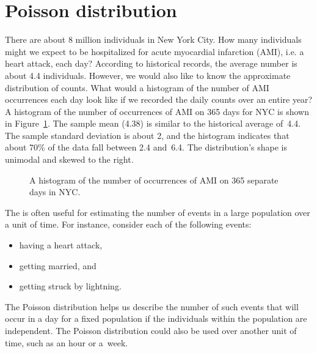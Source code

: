 



\section{Poisson distribution}
\label{poisson}


\begin{examplewrap}
\begin{nexample}{There are about 8 million individuals
    in New York City.
    How many individuals might we expect to be hospitalized
    for acute myocardial infarction (AMI), i.e. a heart attack,
    each day?
    According to historical records, the average number is
    about 4.4 individuals.
    However, we would also like to know the approximate
    distribution of counts.
    What would a histogram of the number of AMI occurrences
    each day look like if we recorded the daily counts over
    an entire year?}
  \label{amiIncidencesEachDayOver1YearInNYCExample}%
  A histogram of the number of occurrences of AMI on 365 days
  for NYC is shown in
  Figure~\ref{amiIncidencesOver100Days}.\footnotemark{}
  The sample mean (4.38) is similar to the historical average
  of~4.4.
  The sample standard deviation is about 2, and the histogram
  indicates that about 70\% of the data fall between 2.4 and~6.4.
  The distribution's shape is unimodal and skewed to the right.
\end{nexample}
\end{examplewrap}

\begin{figure}[h]
  \centering
  \caption{A histogram of the number of occurrences
      of AMI on 365 separate days in NYC.}
  \label{amiIncidencesOver100Days}
\end{figure}

The  is often useful for estimating the number of events in a large population over a unit of time. For instance, consider each of the following events:
\begin{itemize}
\setlength{\itemsep}{0mm}
\item having a heart attack,
\item getting married, and
\item getting struck by lightning.
\end{itemize}
The Poisson distribution helps us describe the number of such events that will occur in a day for a fixed population if the individuals within the population are independent. The Poisson distribution could also be used over another unit of time, such as an hour or a~week.

